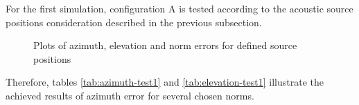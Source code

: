 For the first simulation, configuration A is tested according to the acoustic source positions consideration described in the previous subsection.

\begin{figure}[!htbp]
	
	\captionsetup{justification=centering,margin=2cm}
	\caption{Plots of azimuth, elevation and norm errors for defined source positions}
	\label{fig:s1-A-n10}
\end{figure}






Therefore, tables \ref{tab:azimuth-test1}  and \ref{tab:elevation-test1} illustrate the achieved results of azimuth error for several chosen norms.

